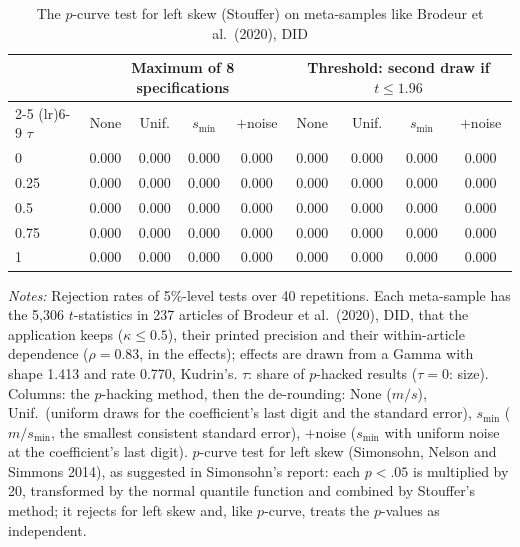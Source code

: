 \begin{table}[htbp]
\centering
\caption{The $p$-curve test for left skew (Stouffer) on meta-samples like Brodeur et al.\ (2020), DID}
\label{tab:brodeur_did_power_stouffer}
\footnotesize
\setlength{\tabcolsep}{4pt}
\begin{tabular}{lcccccccc}
\toprule
 & \multicolumn{4}{c}{Maximum of 8 specifications} & \multicolumn{4}{c}{Threshold: second draw if $t \le 1.96$} \\
\cmidrule(lr){2-5} \cmidrule(lr){6-9}
$\tau$ & None & Unif. & $s_{\min}$ & $+$noise & None & Unif. & $s_{\min}$ & $+$noise \\
\midrule
0 & 0.000 & 0.000 & 0.000 & 0.000 & 0.000 & 0.000 & 0.000 & 0.000 \\
0.25 & 0.000 & 0.000 & 0.000 & 0.000 & 0.000 & 0.000 & 0.000 & 0.000 \\
0.5 & 0.000 & 0.000 & 0.000 & 0.000 & 0.000 & 0.000 & 0.000 & 0.000 \\
0.75 & 0.000 & 0.000 & 0.000 & 0.000 & 0.000 & 0.000 & 0.000 & 0.000 \\
1 & 0.000 & 0.000 & 0.000 & 0.000 & 0.000 & 0.000 & 0.000 & 0.000 \\
\bottomrule
\end{tabular}
\par\smallskip
\begin{minipage}{\linewidth}\footnotesize\textit{Notes:} Rejection rates of 5\%-level tests over 40 repetitions. Each meta-sample has the 5{,}306 $t$-statistics in 237 articles of Brodeur et al.\ (2020), DID, that the application keeps ($\kappa \le 0.5$), their printed precision and their within-article dependence ($\rho = 0.83$, in the effects); effects are drawn from a Gamma with shape 1.413 and rate 0.770, Kudrin's. $\tau$: share of $p$-hacked results ($\tau = 0$: size). Columns: the $p$-hacking method, then the de-rounding: None ($m/s$), Unif.\ (uniform draws for the coefficient's last digit and the standard error), $s_{\min}$ ($m/s_{\min}$, the smallest consistent standard error), $+$noise ($s_{\min}$ with uniform noise at the coefficient's last digit). $p$-curve test for left skew (Simonsohn, Nelson and Simmons 2014), as suggested in Simonsohn's report: each $p < .05$ is multiplied by 20, transformed by the normal quantile function and combined by Stouffer's method; it rejects for left skew and, like $p$-curve, treats the $p$-values as independent.\end{minipage}
\end{table}
